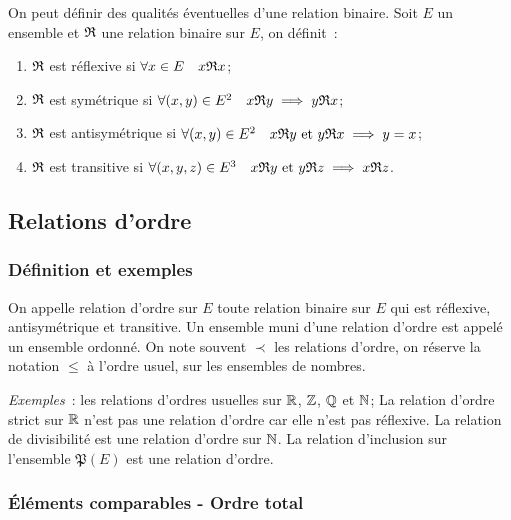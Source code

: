 \begin{defdef}
    On peut définir des qualités éventuelles d'une relation binaire. Soit \(E\) 
    un ensemble et \(\mathfrak{R}{}\) une relation binaire sur \(E\), on définit~:
    \begin{enumerate}
        \item \(\mathfrak{R}{}\) est réflexive si \(\forall x \in E \quad 
            x\mathfrak{R}{}x\);
        \item \(\mathfrak{R}{}\) est symétrique si \(\forall (x,y) \in E^2 \quad 
            x\mathfrak{R}{}y \implies y\mathfrak{R}{}x\);
        \item \(\mathfrak{R}{}\) est antisymétrique si \(\forall (x,y) \in E^2 \quad 
            x\mathfrak{R}{}y \text{~et~} y\mathfrak{R}{}x \implies y=x\);
        \item \(\mathfrak{R}{}\) est transitive si \(\forall (x,y,z) \in E^3 \quad 
            x\mathfrak{R}{}y \text{~et~} y\mathfrak{R}{}z \implies x\mathfrak{R}{}z\).
    \end{enumerate}
\end{defdef}

\subsection{Relations d'ordre}
\label{chap3-subsec:relationdordre}

\subsubsection{Définition et exemples}
\label{chap3-subsubsec:relationordredef}

\begin{defdef}
    On appelle relation d'ordre sur \(E\) toute relation binaire sur \(E\) qui 
    est réflexive, antisymétrique et transitive. Un ensemble muni d'une relation 
    d'ordre est appelé un ensemble ordonné. On note souvent \(\prec\) les 
    relations d'ordre, on réserve la notation \(\leqslant\) à l'ordre usuel, sur 
    les ensembles de nombres.
\end{defdef}

\emph{Exemples}~: les relations d'ordres usuelles sur \(\mathbb{R}\), \(\mathbb{Z}\), \(\mathbb{Q}\) et 
\(\mathbb{N}\); La relation d'ordre strict sur \(\mathbb{R}\) n'est pas une relation d'ordre car 
elle n'est pas réflexive. La relation de divisibilité est une relation d'ordre 
sur \(\mathbb{N}\). La relation d'inclusion sur l'ensemble \(\mathfrak{P}(E)\) est une 
relation d'ordre.

\subsubsection{Éléments comparables - Ordre total}
\label{chap3-subsubsec:ordretotal}

